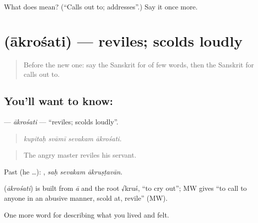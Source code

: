 \begin{tcolorbox}[breakable,colback=teal!4,colframe=teal!35!black,title={Before you move on}]
What does  mean? (\textquotedblleft{}Calls out to; addresses\textquotedblright{}.) Say it once more.
\end{tcolorbox}
\section[\texorpdfstring{\sk{आक्रोशति} (ākrośati)}{आक्रोशति (ākrośati)}]{ (ākrośati) — reviles; scolds loudly}

\label{lesson:SA-C464-akrosati}



\begin{quote}
Before the new one: say the Sanskrit for of few words, then the Sanskrit for calls out to.
\end{quote}

\subsection*{You'll want to know: }
\textbf{} — \emph{ākrośati} — \textquotedblleft{}reviles; scolds loudly\textquotedblright{}.

\begin{quote}
   
\end{quote}

\begin{quote}
\emph{kupitaḥ svāmī sevakam ākrośati.}
\end{quote}

\begin{quote}
The angry master reviles his servant.
\end{quote}

Past (he …):   , \emph{saḥ sevakam ākruṣṭavān}.

\begin{cousinweb}
\textbf{} (\emph{ākrośati}) is built from \emph{ā} and the root √kruś, \textquotedblleft{}to cry out\textquotedblright{}; MW gives \textquotedblleft{}to call to anyone in an abusive manner, scold at, revile\textquotedblright{} (MW).
\end{cousinweb}

\begin{grammarlens}[title={What you've built}]
One more word for describing what you lived and felt.
\end{grammarlens}

